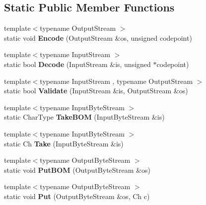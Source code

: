 \subsection*{Static Public Member Functions}
\begin{DoxyCompactItemize}
\item 
\mbox{\label{structASCII_af56b1605fe233c54693facc7de457f72}} 
{\footnotesize template$<$typename Output\+Stream $>$ }\\static void {\bfseries Encode} (Output\+Stream \&os, unsigned codepoint)
\item 
\mbox{\label{structASCII_a44844bbfd0a4fc282993fd72f3f58eee}} 
{\footnotesize template$<$typename Input\+Stream $>$ }\\static bool {\bfseries Decode} (Input\+Stream \&is, unsigned $\ast$codepoint)
\item 
\mbox{\label{structASCII_a398680588a09e6ce9b56e32195047c78}} 
{\footnotesize template$<$typename Input\+Stream , typename Output\+Stream $>$ }\\static bool {\bfseries Validate} (Input\+Stream \&is, Output\+Stream \&os)
\item 
\mbox{\label{structASCII_aad78500eb98f45582a4df020e3fb2278}} 
{\footnotesize template$<$typename Input\+Byte\+Stream $>$ }\\static Char\+Type {\bfseries Take\+B\+OM} (Input\+Byte\+Stream \&is)
\item 
\mbox{\label{structASCII_ab1b9fdf0a5c05658d62fded913d923a3}} 
{\footnotesize template$<$typename Input\+Byte\+Stream $>$ }\\static Ch {\bfseries Take} (Input\+Byte\+Stream \&is)
\item 
\mbox{\label{structASCII_a3036dc1d604039c3224ca0a890ee0134}} 
{\footnotesize template$<$typename Output\+Byte\+Stream $>$ }\\static void {\bfseries Put\+B\+OM} (Output\+Byte\+Stream \&os)
\item 
\mbox{\label{structASCII_a218b244b9cd961ea6c5775a734cec20e}} 
{\footnotesize template$<$typename Output\+Byte\+Stream $>$ }\\static void {\bfseries Put} (Output\+Byte\+Stream \&os, Ch c)

\end{DoxyCompactItemize}
